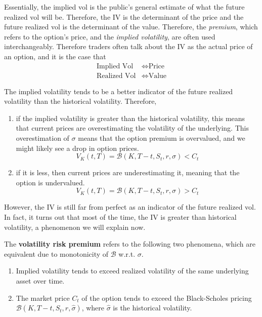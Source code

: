 \documentclass{article}
\begin{document}
    Essentially, the implied vol is the public's general estimate of what the future realized vol will be. Therefore, the IV is the determinant of the price and the future realized vol is the determinant of the value. Therefore, the \textit{premium}, which refers to the option's price, and the \textit{implied volatility}, are often used interchangeably. Therefore traders often talk about the IV as the actual price of an option, and it is the case that 
    \begin{align*}
      \text{Implied Vol} & \iff  \text{Price} \\ 
      \text{Realized Vol} & \iff \text{Value}
    \end{align*}
  
    The implied volatility tends to be a better indicator of the future realized volatility than the historical volatility. Therefore, 
    \begin{enumerate}
      \item if the implied volatility is greater than the historical volatility, this means that current prices are overestimating the volatility of the underlying. This overestimation of $\sigma$ means that the option premium is overvalued, and we might likely see a drop in option prices. 
      \begin{equation}
        V_K (t, T) = \mathcal{B} (K, T - t, S_t, r, \sigma) < C_t
      \end{equation}

      \item if it is less, then current prices are underestimating it, meaning that the option is undervalued. 
      \begin{equation}
        V_K (t, T) = \mathcal{B} (K, T - t, S_t, r, \sigma) > C_t
      \end{equation}
    \end{enumerate}
    However, the IV is still far from perfect as an indicator of the future realized vol. In fact, it turns out that most of the time, the IV is greater than historical volatility, a phenomenon we will explain now. 

    \begin{theorem}
      \label{thm:volatility-risk-premium}
      The \textbf{volatility risk premium} refers to the following two phenomena, which are equivalent due to monotonicity of $\mathcal{B}$ w.r.t. $\sigma$. 
      \begin{enumerate}
        \item Implied volatility tends to exceed realized volatility of the same underlying asset over time. 
        \item The market price $C_t$ of the option tends to exceed the Black-Scholes pricing $\mathcal{B}(K, T - t, S_t, r, \hat{\sigma})$, where $\hat{\sigma}$ is the historical volatility. 
      \end{enumerate}
    \end{theorem}
\end{document}
